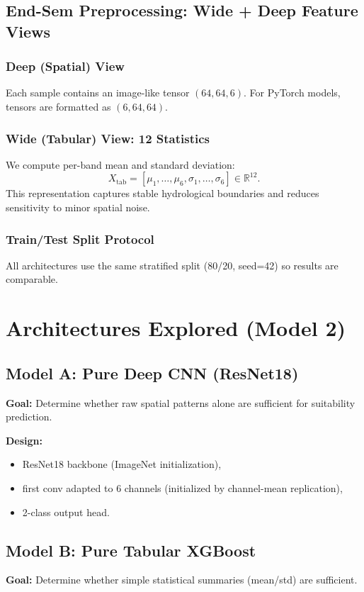 \documentclass[12pt,a4paper]{report}
\begin{document}
\section{End-Sem Preprocessing: Wide + Deep Feature Views}
\subsection{Deep (Spatial) View}
Each sample contains an image-like tensor \((64,64,6)\). For PyTorch models, tensors are formatted as \((6,64,64)\).

\subsection{Wide (Tabular) View: 12 Statistics}
We compute per-band mean and standard deviation:
\[
X_{\text{tab}} = [\mu_1,\dots,\mu_6,\sigma_1,\dots,\sigma_6] \in \mathbb{R}^{12}.
\]
This representation captures stable hydrological boundaries and reduces sensitivity to minor spatial noise.

\subsection{Train/Test Split Protocol}
All architectures use the same stratified split (80/20, seed=42) so results are comparable.

\chapter{Architectures Explored (Model 2)}

\section{Model A: Pure Deep CNN (ResNet18)}
\textbf{Goal:} Determine whether raw spatial patterns alone are sufficient for suitability prediction.

\textbf{Design:}
\begin{itemize}
  \item ResNet18 backbone (ImageNet initialization),
  \item first conv adapted to 6 channels (initialized by channel-mean replication),
  \item 2-class output head.
\end{itemize}

\section{Model B: Pure Tabular XGBoost}
\textbf{Goal:} Determine whether simple statistical summaries (mean/std) are sufficient.
\end{document}
